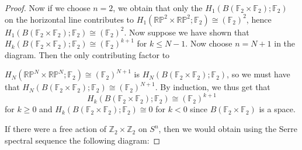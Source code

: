 \documentclass[reqno]{amsart}
\theoremstyle{definition}
\theoremstyle{remark}
\begin{document}
\begin{proof}
Now if we choose $n = 2$, we obtain that
only the $H_1 \left( B \left( \mathbb{F}_2 \times 
\mathbb{F}_2\right) ; \mathbb{F}_2 \right) $ on the horizontal
line contributes to
 $H_1 \left( \mathbb{R}\mathbb{P}^{2}\times 
 \mathbb{R}\mathbb{P}^{2}; \mathbb{F}_2\right) 
 \cong \left( \mathbb{F}_2 \right)^2$, hence
 $H_1 \left( B
 \left( \mathbb{F}_2 \times \mathbb{F}_2 \right) ;
\mathbb{F}_2\right) \cong
\left( \mathbb{F}_2 \right)^2$.
Now suppose we have shown that
$H_k \left( B \left( \mathbb{F}_2 \times \mathbb{F}_2
\right) ; \mathbb{F}_2  \right) \cong
\left( \mathbb{F}_2 \right)^{k+1}$ for
$k \le N-1$.
Now choose
$n = N+1$ in the diagram. Then the
only contributing factor to

$H_N \left( \mathbb{R}\mathbb{P}^{N} \times 
\mathbb{R}\mathbb{P}^{N} ; \mathbb{F}_2\right) 
\cong \left( \mathbb{F}_2 \right)^{N+1}$ is
$H_N \left( B \left( \mathbb{F}_2 \times 
\mathbb{F}_2 \right) ; \mathbb{F}_2  \right) $, so
we must have that
$H_N
\left( B\left( \mathbb{F}_2 \times \mathbb{F}_2 \right) ;
\mathbb{F}_2\right) \cong
\left( \mathbb{F}_2 \right)^{N+1}$.
By induction, we thus get that
\[
H_k \left( B \left( \mathbb{F}_2 \times \mathbb{F}_2 \right) ;
\mathbb{F}_2\right) \cong
\left( \mathbb{F}_2 \right)^{k+1}
\] 
for $k\ge 0$ and
 $H_k \left( B \left( \mathbb{F}_2 \times \mathbb{F}_2 \right) ;
 \mathbb{F}_2\right) \cong 0$ for $k<0$ since
 $B\left( \mathbb{F}_2 \times \mathbb{F}_2 \right) $ is a space.

 If there were a free action of $\mathbb{Z}_2 \times \mathbb{Z}_2$ 
 on $S^{n}$, then we would obtain using the Serre
 spectral sequence the following diagram:





\end{proof}
\end{document}
